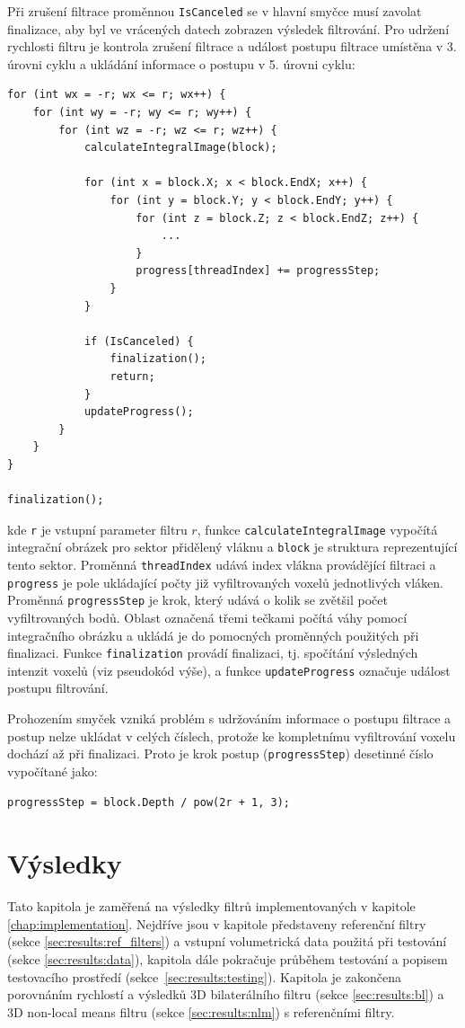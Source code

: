 Při zrušení filtrace proměnnou \texttt{IsCanceled} se v hlavní smyčce musí zavolat finalizace, aby byl ve vrácených datech zobrazen výsledek filtrování. Pro udržení rychlosti filtru je kontrola zrušení filtrace a událost postupu filtrace umístěna v 3. úrovni cyklu a ukládání informace o postupu v 5. úrovni cyklu:
\begin{verbatim}
for (int wx = -r; wx <= r; wx++) {
    for (int wy = -r; wy <= r; wy++) {
        for (int wz = -r; wz <= r; wz++) {
            calculateIntegralImage(block);
            
            for (int x = block.X; x < block.EndX; x++) {
                for (int y = block.Y; y < block.EndY; y++) {
                    for (int z = block.Z; z < block.EndZ; z++) {
                        ...
                    }
                    progress[threadIndex] += progressStep;
                }
            }
            
            if (IsCanceled) {
                finalization();
                return;
            }
            updateProgress();
        }
    }
}

finalization();
\end{verbatim}
kde \texttt{r} je vstupní parameter filtru $r$, funkce \texttt{calculateIntegralImage} vypočítá integrační obrázek pro sektor přidělený vláknu a \texttt{block} je struktura reprezentující tento sektor. Proměnná \texttt{threadIndex} udává index vlákna provádějící filtraci a \texttt{progress} je pole ukládající počty již vyfiltrovaných voxelů jednotlivých vláken. Proměnná \texttt{progressStep} je krok, který udává o kolik se zvětšil počet vyfiltrovaných bodů. Oblast označená třemi tečkami počítá váhy pomocí integračního obrázku a ukládá je do pomocných proměnných použitých při finalizaci. Funkce \texttt{finalization} provádí finalizaci, tj. spočítání výsledných intenzit voxelů (viz pseudokód výše), a funkce \texttt{updateProgress} označuje událost postupu filtrování.

Prohozením smyček vzniká problém s udržováním informace o postupu filtrace a postup nelze ukládat v celých číslech, protože ke kompletnímu vyfiltrování voxelu dochází až při finalizaci. Proto je krok postup (\texttt{progressStep}) desetinné číslo vypočítané jako:
\begin{verbatim}
progressStep = block.Depth / pow(2r + 1, 3);
\end{verbatim}

\chapter{Výsledky}
\label{chap:results}
Tato kapitola je zaměřená na výsledky filtrů implementovaných v kapitole \ref{chap:implementation}. Nejdříve jsou v kapitole představeny referenční filtry (sekce \ref{sec:results:ref_filters}) a vstupní volumetrická data použitá při testování (sekce \ref{sec:results:data}), kapitola dále pokračuje průběhem testování a popisem testovacího prostředí (sekce~\ref{sec:results:testing}). Kapitola je zakončena porovnáním rychlostí a výsledků 3D bilaterálního filtru (sekce \ref{sec:results:bl}) a 3D non-local means filtru (sekce \ref{sec:results:nlm}) s referenčními filtry.

